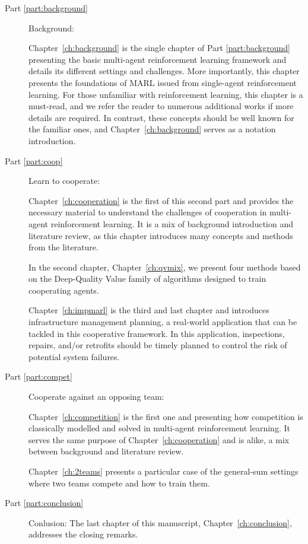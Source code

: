 \begin{description}
    \item [Part \ref{part:background}] Background:
    
    Chapter~\ref{ch:background} is the single chapter of Part \ref{part:background} presenting the basic multi-agent reinforcement learning framework and details its different settings and challenges.
    More importantly, this chapter presents the foundations of MARL issued from single-agent reinforcement learning.
    For those unfamiliar with reinforcement learning, this chapter is a must-read, and we refer the reader to numerous additional works if more details are required.
    In contrast, these concepts should be well known for the familiar ones, and Chapter~\ref{ch:background} serves as a notation introduction.

    \item [Part \ref{part:coop}] Learn to cooperate:
    
    Chapter~\ref{ch:cooperation} is the first of this second part and provides the necessary material to understand the challenges of cooperation in multi-agent reinforcement learning.
    It is a mix of background introduction and literature review, as this chapter introduces many concepts and methods from the literature.
    
    In the second chapter, Chapter~\ref{ch:qvmix}, we present four methods based on the Deep-Quality Value family of algorithms designed to train cooperating agents.
    
    Chapter~\ref{ch:impmarl} is the third and last chapter and introduces infrastructure management planning, a real-world application that can be tackled in this cooperative framework.
    In this application, inspections, repairs, and/or retrofits should be timely planned to control the risk of potential system failures.
    
    \item [Part \ref{part:compet}]  Cooperate against an opposing team:
    
    Chapter~\ref{ch:competition} is the first one and presenting how competition is classically modelled and solved in multi-agent reinforcement learning.
    It serves the same purpose of Chapter~\ref{ch:cooperation} and is alike, a mix between background and literature review.
    
    Chapter~\ref{ch:2teams} presents a particular case of the general-sum settings where two teams compete and how to train them.

    \item [Part \ref{part:conclusion}] Conlusion:
    The last chapter of this manuscript, Chapter~\ref{ch:conclusion}, addresses the closing remarks.
\end{description}

